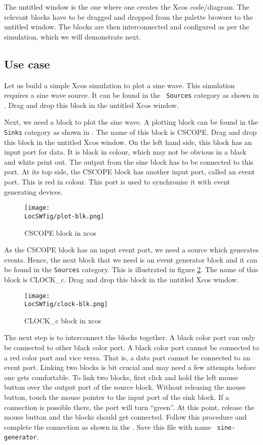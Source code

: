 The untitled window is the one where one creates the Xcos
code/diagram. The relevant blocks have to be dragged and dropped from
the palette browser to the untitled window. The blocks are then
interconnected and configured as per the simulation, which we will
demonstrate next.

\subsection{Use case}
Let us build a simple Xcos simulation to plot a sine wave. This
simulation requires a sine wave source. It can be found in the {\tt
            Sources} category as shown in . Drag and drop this
block in the untitled Xcos window. 

Next, we need a block to plot the sine wave. A plotting block can be
found in the {\tt Sinks} category as shown in . The
name of this block is CSCOPE. Drag and drop this block in the untitled
Xcos window.  On the left hand side, this block has an input port for
data.  It is black in colour, which may not be obvious in a black and
white print out.  The output from the sine block has to be connected
to this port.  At its top side, the CSCOPE block has another input
port, called an event port.  This is red in colour.  This port is used
to synchronise it with event generating devices.

\begin{figure}
      \centering
      \texttt{[image: \\LocSWfig/plot-blk.png]}
      \caption{CSCOPE block in xcos}
      \label{plot-blk}
\end{figure}

As the CSCOPE block has an
input event port, we need a source which generates events. Hence, the
next block that we need is an event generator block and it can be
found in the {\tt Sources} category. This is illustrated in figure
\ref{clk-blk}. The name of this block is CLOCK\_c. Drag and drop this
block in the untitled Xcos window.

\begin{figure}
      \centering
      \texttt{[image: \\LocSWfig/clock-blk.png]}
      \caption{CLOCK\_c block in xcos}
      \label{clk-blk}
\end{figure}

The next step is to interconnect the blocks together. A black color
port can only be connected to other black color port. A black color
port cannot be connected to a red color port and vice versa.  That is,
a data port cannot be connected to an event port.  Linking
two blocks is bit crucial and may need a few attempts before one gets
comfortable. To link two blocks, first click and hold the left mouse
button over the output port of the source block. Without releasing the
mouse button, touch the mouse pointer to the input port of the sink
block. If a connection is possible there, the port will turn
``green''. At this point, release the mouse button and the blocks should
get connected. Follow this procedure and complete the connection as
shown in the .  Save this file with name {\tt
            sine-generator}.  

